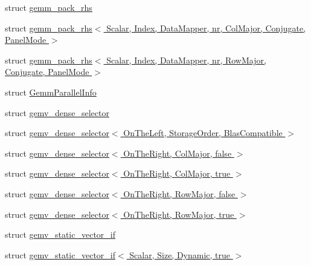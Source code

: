 \begin{DoxyCompactItemize}
\item 
struct \hyperlink{struct_eigen_1_1internal_1_1gemm__pack__rhs}{gemm\+\_\+pack\+\_\+rhs}
\item 
struct \hyperlink{struct_eigen_1_1internal_1_1gemm__pack__rhs_3_01_scalar_00_01_index_00_01_data_mapper_00_01nr_00e5afdbaca90e394aa6e3c7b4d02529b6}{gemm\+\_\+pack\+\_\+rhs$<$ Scalar, Index, Data\+Mapper, nr, Col\+Major, Conjugate, Panel\+Mode $>$}
\item 
struct \hyperlink{struct_eigen_1_1internal_1_1gemm__pack__rhs_3_01_scalar_00_01_index_00_01_data_mapper_00_01nr_00b7f2442d9ba6129104d4662213736528}{gemm\+\_\+pack\+\_\+rhs$<$ Scalar, Index, Data\+Mapper, nr, Row\+Major, Conjugate, Panel\+Mode $>$}
\item 
struct \hyperlink{struct_eigen_1_1internal_1_1_gemm_parallel_info}{Gemm\+Parallel\+Info}
\item 
struct \hyperlink{struct_eigen_1_1internal_1_1gemv__dense__selector}{gemv\+\_\+dense\+\_\+selector}
\item 
struct \hyperlink{struct_eigen_1_1internal_1_1gemv__dense__selector_3_01_on_the_left_00_01_storage_order_00_01_blas_compatible_01_4}{gemv\+\_\+dense\+\_\+selector$<$ On\+The\+Left, Storage\+Order, Blas\+Compatible $>$}
\item 
struct \hyperlink{struct_eigen_1_1internal_1_1gemv__dense__selector_3_01_on_the_right_00_01_col_major_00_01false_01_4}{gemv\+\_\+dense\+\_\+selector$<$ On\+The\+Right, Col\+Major, false $>$}
\item 
struct \hyperlink{struct_eigen_1_1internal_1_1gemv__dense__selector_3_01_on_the_right_00_01_col_major_00_01true_01_4}{gemv\+\_\+dense\+\_\+selector$<$ On\+The\+Right, Col\+Major, true $>$}
\item 
struct \hyperlink{struct_eigen_1_1internal_1_1gemv__dense__selector_3_01_on_the_right_00_01_row_major_00_01false_01_4}{gemv\+\_\+dense\+\_\+selector$<$ On\+The\+Right, Row\+Major, false $>$}
\item 
struct \hyperlink{struct_eigen_1_1internal_1_1gemv__dense__selector_3_01_on_the_right_00_01_row_major_00_01true_01_4}{gemv\+\_\+dense\+\_\+selector$<$ On\+The\+Right, Row\+Major, true $>$}
\item 
struct \hyperlink{struct_eigen_1_1internal_1_1gemv__static__vector__if}{gemv\+\_\+static\+\_\+vector\+\_\+if}
\item 
struct \hyperlink{struct_eigen_1_1internal_1_1gemv__static__vector__if_3_01_scalar_00_01_size_00_01_dynamic_00_01true_01_4}{gemv\+\_\+static\+\_\+vector\+\_\+if$<$ Scalar, Size, Dynamic, true $>$}

\end{DoxyCompactItemize}
